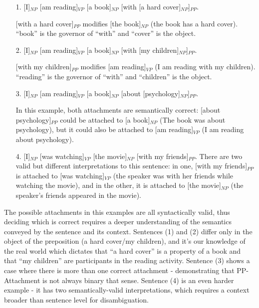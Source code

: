 \begin{enumerate} \label{ex:ppatt}
    \item[1.] [I]$_{NP}$ [am reading]$_{VP}$ [a book]$_{NP}$ [with [a hard cover]$_{NP}$]$_{PP}$. 

[with a hard cover]$_{PP}$ modifies [the book]$_{NP}$ (the book has a hard cover). “book” is the governor of “with” and “cover” is the object.

    \item[2.] [I]$_{NP}$ [am reading]$_{VP}$ [a book]$_{NP}$ [with  [my children]$_{NP}$]$_{PP}$. 

    [with my children]$_{PP}$ modifies [am reading]$_{VP}$ (I am reading with my children). “reading” is the governor of “with” and “children” is the object.

    \item[3.] [I]$_{NP}$ [am reading]$_{VP}$ [a book]$_{NP}$ [about [psychology]$_{NP}$]$_{PP}$. 
    
    In this example, both attachments are semantically correct: [about psychology]$_{PP}$ could be attached to [a book]$_{NP}$ (The book was about psychology), but it could also be attached to [am reading]$_{VP}$ (I am reading about psychology).

    \item[4.] [I]$_{NP}$ [was watching]$_{VP}$ [the movie]$_{NP}$ [with my friends]$_{PP}$. 
    There are two valid but different interpretations to this sentence: in one, [with my friends]$_{PP}$ is attached to [was watching]$_{VP}$ (the speaker was with her friends while watching the movie), and in the other, it is attached to [the movie]$_{NP}$ (the speaker’s friends appeared in the movie).

\end{enumerate}

The possible attachments in this examples are all syntactically valid, thus deciding which is correct requires a deeper understanding of the semantics conveyed by the sentence and its context.
Sentences (1) and (2) differ only in the object of the preposition (a hard cover/my children), and it’s our knowledge of the real world which dictates that “a hard cover” is a property of a book and that “my children” are participants in the reading activity. Sentence (3) shows a case where there is more than one correct attachment - demonstrating that PP-Attachment is not always binary that sense. Sentence (4) is an even harder example - it has two semantically-valid interpretations, which requires a context broader than sentence level for disambiguation.  
